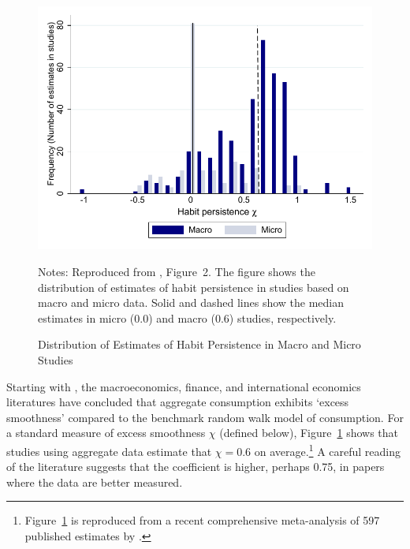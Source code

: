 \documentclass[titlepage]{./econtex}
\begin{document}
\begin{figure}
  \centering
\caption{Distribution of Estimates of Habit Persistence in Macro and Micro Studies}
\label{microMacroMetaHistogram}
\hypertarget{microMacroMetaHistogram}{}
    { \includegraphics[width=1.0\textwidth]{./Figures/microMacroMetaHistogram}}

    \begin{flushleft}
      \footnotesize Notes: Reproduced from \cite{hrsHabit}, Figure~2. The figure shows the distribution of estimates of habit persistence in studies based on macro and micro data. Solid and dashed lines show the median estimates in micro (0.0) and macro (0.6) studies, respectively.
      \end{flushleft}
\end{figure}

Starting with \cite{cdSmooth}, the macroeconomics, finance, and international economics literatures have concluded that aggregate consumption exhibits `excess smoothness' compared to the benchmark \cite{hallRandomWalk} random walk model of consumption. For a standard measure of excess smoothness $\chi$ (defined below), Figure~\ref{microMacroMetaHistogram} shows that studies using aggregate data estimate that $\chi=0.6$ on average.\footnote{Figure~\ref{microMacroMetaHistogram} is reproduced from a recent comprehensive meta-analysis of 597 published estimates by \cite{hrsHabit}.} A careful reading of the literature suggests that the coefficient is higher, perhaps 0.75, in papers where the data are better measured.
\end{document}
